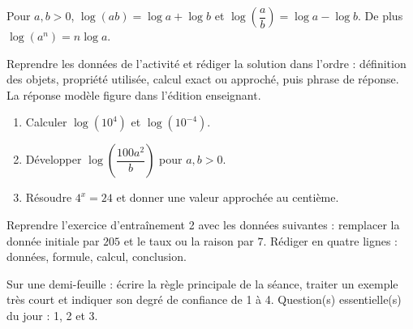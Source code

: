 \begin{traceecrite}Pour $a,b>0$, $\log(ab)=\log a+\log b$ et $\log\!\left(\dfrac ab\right)=\log a-\log b$. De plus $\log(a^n)=n\log a$.\end{traceecrite}

\begin{exemple}
Reprendre les données de l'activité et rédiger la solution dans l'ordre : définition des objets, propriété utilisée, calcul exact ou approché, puis phrase de réponse. La réponse modèle figure dans l'édition enseignant.
\end{exemple}

\begin{exercice}[-- essentiel]
\begin{enumerate}\item Calculer $\log(10^4)$ et $\log(10^{-4})$.\item Développer $\log\!\left(\dfrac{100a^2}{b}\right)$ pour $a,b>0$.\item Résoudre $4^x=24$ et donner une valeur approchée au centième.\end{enumerate}
\end{exercice}


\begin{dm}Reprendre l'exercice d'entraînement 2 avec les données suivantes : remplacer la donnée initiale par $205$ et le taux ou la raison par $7$. Rédiger en quatre lignes : données, formule, calcul, conclusion.\end{dm}

\begin{sortie}Sur une demi-feuille : écrire la règle principale de la séance, traiter un exemple très court et indiquer son degré de confiance de 1 à 4. Question(s) essentielle(s) du jour : 1, 2 et 3.\end{sortie}

